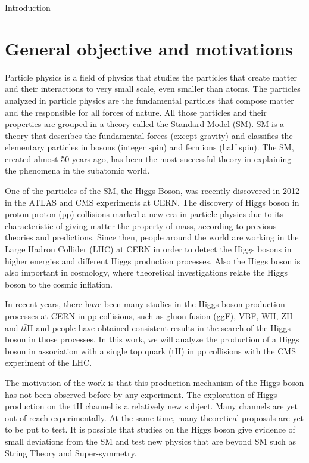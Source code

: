 
\begin{chapter}{Introduction}

\section{General objective and motivations}

Particle physics is a field of physics that studies the particles that create matter and their interactions to very small scale, even smaller than atoms. The particles analyzed in particle physics are the fundamental particles that compose matter and the responsible for all forces of nature. All those particles and their properties are grouped in a theory called the Standard Model (SM). SM is a theory that describes the fundamental forces (except gravity) and classifies the elementary particles in bosons (integer spin) and fermions (half spin).
The SM, created almost 50 years ago, has been the most successful theory in explaining the phenomena in the subatomic world.

One of the particles of the SM, the Higgs Boson, was recently discovered in 2012 in the ATLAS and CMS experiments at CERN. The discovery of Higgs boson in proton proton (pp) collisions marked a new era in particle physics due to its characteristic of giving matter the property of mass, according to previous theories and predictions. Since then, people around the world are working in the Large Hadron Collider (LHC) at CERN in order to detect the Higgs bosons in higher energies and different Higgs production processes. 
Also the Higgs boson is also important in cosmology, where theoretical investigations relate the Higgs boson to the cosmic inflation.

In recent years, there have been many studies in the Higgs boson production processes at CERN in pp collisions, such as gluon fusion (ggF), VBF, WH, ZH and $t\bar{t}$H and people have obtained consistent results in the search of the Higgs boson in those processes. 
In this work, we will analyze the production of a Higgs boson in association with a
single top quark (tH) in pp collisions with the CMS experiment of the LHC. 

The motivation of the work is that this production mechanism of the Higgs boson has not been observed before by any experiment. The exploration of Higgs production on the tH channel is a relatively new subject. %
Many channels are yet out of
reach experimentally. At the same time, many theoretical
proposals are yet to be put to test. It is possible that studies on the Higgs boson give evidence of small deviations from the SM and test new physics that are beyond SM such as String Theory and Super-symmetry. 


\end{chapter}
